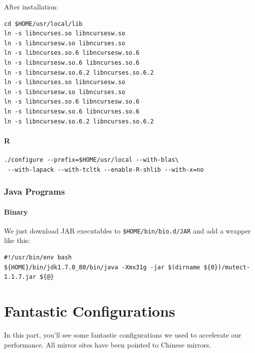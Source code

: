 \documentclass[]{article}
\begin{document}
After installation:

\begin{verbatim}
cd $HOME/usr/local/lib
ln -s libncurses.so libncursesw.so
ln -s libncursesw.so libncurses.so
ln -s libncurses.so.6 libncursesw.so.6
ln -s libncursesw.so.6 libncurses.so.6
ln -s libncursesw.so.6.2 libncurses.so.6.2
ln -s libncurses.so libncursesw.so
ln -s libncursesw.so libncurses.so
ln -s libncurses.so.6 libncursesw.so.6
ln -s libncursesw.so.6 libncurses.so.6
ln -s libncursesw.so.6.2 libncurses.so.6.2
\end{verbatim}

\subsection{R}
\begin{verbatim}
./configure --prefix=$HOME/usr/local --with-blas\
 --with-lapack --with-tcltk --enable-R-shlib --with-x=no
\end{verbatim}

\section{Java Programs}

\subsection{Binary}
We just download JAR executables to \verb|$HOME/bin/bio.d/JAR| and add a wrapper like this:

\begin{verbatim}
#!/usr/bin/env bash
${HOME}/bin/jdk1.7.0_80/bin/java -Xmx31g -jar $(dirname ${0})/mutect-1.1.7.jar ${@}
\end{verbatim}

\part{Fantastic Configurations}
In this part, you'll see some fantastic configurations we used to accelerate our performance. All mirror sites have been pointed to Chinese mirrors.
\end{document}
